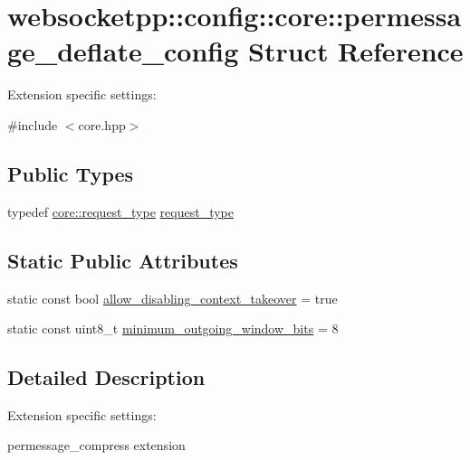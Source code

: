 \hypertarget{structwebsocketpp_1_1config_1_1core_1_1permessage__deflate__config}{}\section{websocketpp\+:\+:config\+:\+:core\+:\+:permessage\+\_\+deflate\+\_\+config Struct Reference}
\label{structwebsocketpp_1_1config_1_1core_1_1permessage__deflate__config}


Extension specific settings\+:  




{\ttfamily \#include $<$core.\+hpp$>$}

\subsection*{Public Types}
\begin{DoxyCompactItemize}
\item 
typedef \hyperlink{structwebsocketpp_1_1config_1_1core_a6b17eee7cb81f247afc8f3d7b3a3fc9e}{core\+::request\+\_\+type} \hyperlink{structwebsocketpp_1_1config_1_1core_1_1permessage__deflate__config_aba198d4d1a05699588fb13335b57b38c}{request\+\_\+type}
\end{DoxyCompactItemize}
\subsection*{Static Public Attributes}
\begin{DoxyCompactItemize}
\item 
static const bool \hyperlink{structwebsocketpp_1_1config_1_1core_1_1permessage__deflate__config_ac9b85348637f891c2965e15532a7018e}{allow\+\_\+disabling\+\_\+context\+\_\+takeover} = true
\item 
static const uint8\+\_\+t \hyperlink{structwebsocketpp_1_1config_1_1core_1_1permessage__deflate__config_aa43d8526e2b89349b3fd9a5372507594}{minimum\+\_\+outgoing\+\_\+window\+\_\+bits} = 8
\end{DoxyCompactItemize}


\subsection{Detailed Description}
Extension specific settings\+: 

permessage\+\_\+compress extension 

